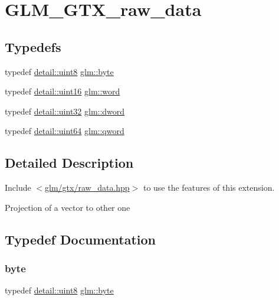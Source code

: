 \hypertarget{group__gtx__raw__data}{}\section{G\+L\+M\+\_\+\+G\+T\+X\+\_\+raw\+\_\+data}
\label{group__gtx__raw__data}
\subsection*{Typedefs}
\begin{DoxyCompactItemize}
\item 
typedef \hyperlink{namespaceglm_1_1detail_aef2588f97d090cc19fbbe0c74fe17c8f}{detail\+::uint8} \hyperlink{group__gtx__raw__data_gacd7fe1f2ad60a57f7d7ad4f1e6836efd}{glm\+::byte}
\item 
typedef \hyperlink{namespaceglm_1_1detail_a47b2a7d006d187338e8031a352d1ce56}{detail\+::uint16} \hyperlink{group__gtx__raw__data_ga5617a479d471021b5c773c5e969ba46d}{glm\+::word}
\item 
typedef \hyperlink{namespaceglm_1_1detail_ade6cfbf377022aaa391af8cd50489222}{detail\+::uint32} \hyperlink{group__gtx__raw__data_ga1fc2589df6d44e923cd1820cf14805cf}{glm\+::dword}
\item 
typedef \hyperlink{namespaceglm_1_1detail_adec4b19bf4982125e122db2fe03c5810}{detail\+::uint64} \hyperlink{group__gtx__raw__data_ga32447af289e879589883c9b7e3be1246}{glm\+::qword}
\end{DoxyCompactItemize}


\subsection{Detailed Description}
Include $<$\hyperlink{raw__data_8hpp}{glm/gtx/raw\+\_\+data.\+hpp}$>$ to use the features of this extension.

Projection of a vector to other one 

\subsection{Typedef Documentation}
\mbox{\label{group__gtx__raw__data_gacd7fe1f2ad60a57f7d7ad4f1e6836efd}} 
\subsubsection{\texorpdfstring{byte}{byte}}
{\footnotesize\ttfamily typedef \hyperlink{namespaceglm_1_1detail_aef2588f97d090cc19fbbe0c74fe17c8f}{detail\+::uint8} \hyperlink{group__gtx__raw__data_gacd7fe1f2ad60a57f7d7ad4f1e6836efd}{glm\+::byte}}

